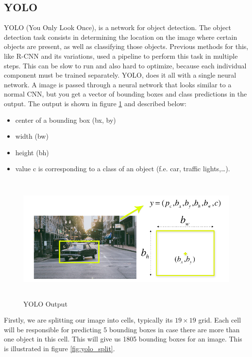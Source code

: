 \documentclass[twoside]{article}
\begin{document}
\subsection{YOLO\cite{yolo}}
YOLO (You Only Look Once), is a network for object detection. The object detection task consists in determining the location on the image where certain objects are present, as well as classifying those objects. Previous methods for this, like R-CNN and its variations, used a pipeline to perform this task in multiple steps. This can be slow to run and also hard to optimize, because each individual component must be trained separately. YOLO, does it all with a single neural network. A image is passed through a neural network that looks similar to a normal CNN, but you get a vector of bounding boxes and class predictions in the output. The output is shown in figure \ref{fig:yolo output} and described below:
\begin{itemize}
    \item center of a bounding box (bx, by)
    \item width (bw)
    \item height (bh)
    \item value c is corresponding to a class of an object (f.e. car, traffic lights,…).
\end{itemize}
\begin{figure}[!htb]
\centering
\includegraphics[height=2.5in]{pics/yolo_output.png}
\caption{YOLO Output}
\label{fig:yolo output}
\end{figure}
Firstly, we are splitting our image into cells, typically its $19 \times 19$ grid. Each cell will be responsible for predicting 5 bounding boxes in case there are more than one object in this cell. This will give us 1805 bounding boxes for an image. This is illustrated in figure \ref{fig:yolo_split}.\newline
\end{document}
